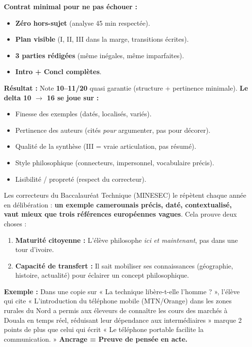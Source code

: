 \documentclass[11pt]{article}
\begin{document}
\begin{aretenir}
\textbf{Contrat minimal pour ne pas échouer :}
\begin{itemize}
\item \textbf{Zéro hors-sujet} (analyse 45 min respectée).
\item \textbf{Plan visible} (I, II, III dans la marge, transitions écrites).
\item \textbf{3 parties rédigées} (même inégales, même imparfaites).
\item \textbf{Intro + Concl complètes}.
\end{itemize}
\textbf{Résultat :} Note \textbf{10–11/20} quasi garantie (structure + pertinence minimale).
\textbf{Le delta 10 $\rightarrow$ 16 se joue sur :}
\begin{itemize}
\item Finesse des exemples (datés, localisés, variés).
\item Pertinence des auteurs (cités \emph{pour} argumenter, pas pour décorer).
\item Qualité de la synthèse (III = vraie articulation, pas résumé).
\item Style philosophique (connecteurs, impersonnel, vocabulaire précis).
\item Lisibilité / propreté (respect du correcteur).
\end{itemize}
\end{aretenir}

\begin{savaistu}
Les correcteurs du Baccalauréat Technique (MINESEC) le répètent chaque année en délibération : \textbf{un exemple camerounais précis, daté, contextualisé, vaut mieux que trois références européennes vagues}. Cela prouve deux choses :
\begin{enumerate}
\item \textbf{Maturité citoyenne :} L'élève philosophe \emph{ici et maintenant}, pas dans une tour d'ivoire.
\item \textbf{Capacité de transfert :} Il sait mobiliser ses connaissances (géographie, histoire, actualité) pour éclairer un concept philosophique.
\end{enumerate}
\textbf{Exemple :} Dans une copie sur « La technique libère-t-elle l'homme ? », l'élève qui cite « L'introduction du téléphone mobile (MTN/Orange) dans les zones rurales du Nord a permis aux éleveurs de connaître les cours des marchés à Douala en temps réel, réduisant leur dépendance aux intermédiaires » marque 2 points de plus que celui qui écrit « Le téléphone portable facilite la communication. » \textbf{Ancrage = Preuve de pensée en acte.}
\end{savaistu}
\end{document}

